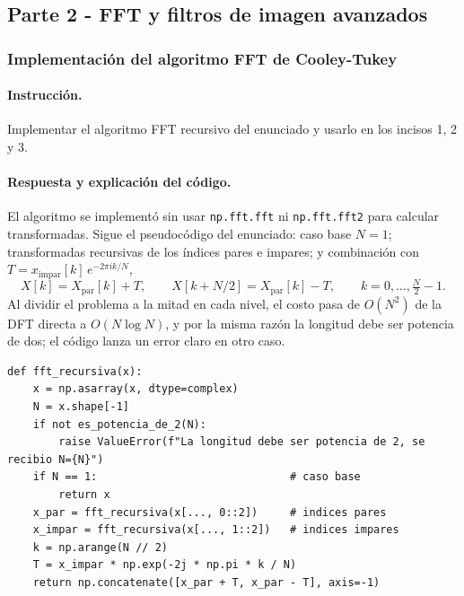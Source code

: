 \documentclass[11pt]{article}
\begin{document}
\clearpage
\subsection*{Parte 2 - FFT y filtros de imagen avanzados}

\noindent

\subsubsection*{Implementación del algoritmo FFT de Cooley-Tukey}

\paragraph{Instrucción.}
Implementar el algoritmo FFT recursivo del enunciado y usarlo en los incisos 1, 2 y 3.

\paragraph{Respuesta y explicación del código.}
El algoritmo se implementó sin usar \texttt{np.fft.fft} ni \texttt{np.fft.fft2} para calcular transformadas.
Sigue el pseudocódigo del enunciado: caso base $N=1$; transformadas recursivas de los índices pares e impares;
y combinación con $T=x_{\text{impar}}[k]\,e^{-2\pi ik/N}$,
\begin{equation}
 X[k]=X_{\text{par}}[k]+T,\qquad X[k+N/2]=X_{\text{par}}[k]-T,\qquad k=0,\dots,\tfrac N2-1.
\end{equation}
Al dividir el problema a la mitad en cada nivel, el costo pasa de $O(N^2)$ de la DFT directa a $O(N\log N)$,
y por la misma razón la longitud debe ser potencia de dos; el código lanza un error claro en otro caso.

\begin{lstlisting}
def fft_recursiva(x):
    x = np.asarray(x, dtype=complex)
    N = x.shape[-1]
    if not es_potencia_de_2(N):
        raise ValueError(f"La longitud debe ser potencia de 2, se recibio N={N}")
    if N == 1:                              # caso base
        return x
    x_par = fft_recursiva(x[..., 0::2])     # indices pares
    x_impar = fft_recursiva(x[..., 1::2])   # indices impares
    k = np.arange(N // 2)
    T = x_impar * np.exp(-2j * np.pi * k / N)
    return np.concatenate([x_par + T, x_par - T], axis=-1)
\end{lstlisting}
\end{document}
